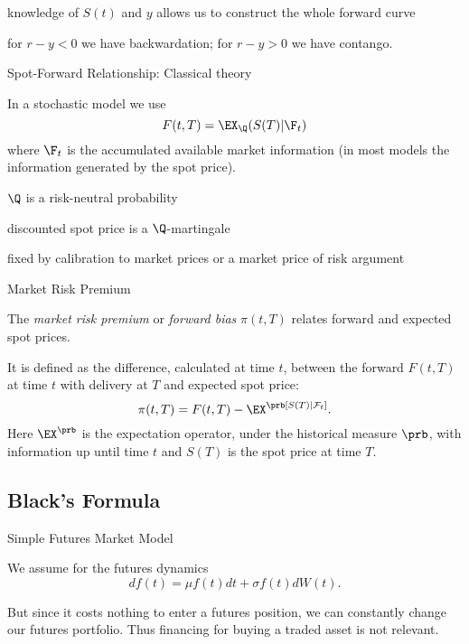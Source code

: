 	knowledge of $S(t)$ and $y$ allows us to construct the whole forward curve

	for $r-y <0$ we have backwardation; for $r-y>0$ we have contango.


{Spot-Forward Relationship: Classical theory}


	In a stochastic model we use
$$
F(t,T)=\EX_{\Q}(S(T)|\F_t)
$$
where $\F_t$ is the accumulated available market information (in most models the information generated by the spot price).

	$\Q$ is a risk-neutral probability


	discounted spot price is a $\Q$-martingale

	fixed by calibration to market prices or a market price of risk argument



{Market Risk Premium}


	The \emph{market risk premium} or \emph{forward bias} $\pi (t,T)$
relates forward and expected spot prices.

	It is defined as the difference, calculated at time $t$, between
the forward $F(t,T)$ at time $t$ with delivery at $T$ and expected
spot price:
\begin{equation}\label{forward risk premium}
\pi(t,T)= F(t,T)-\EX^\prb[S(T)|\mathcal F_t].
\end{equation}
Here $\EX^\prb$ is the expectation operator, under the
historical measure $\prb$, with information up until time $t$ and
$S(T)$ is the spot price at time $T$.


\subsection{Black's Formula}

{Simple Futures Market Model}


	We assume for the futures dynamics
$$
df(t) = \mu f(t) dt + \sigma f(t) dW(t).
$$

	But since it costs nothing to enter a futures position, we can constantly change our futures portfolio.
Thus financing for buying a traded asset is not relevant.


